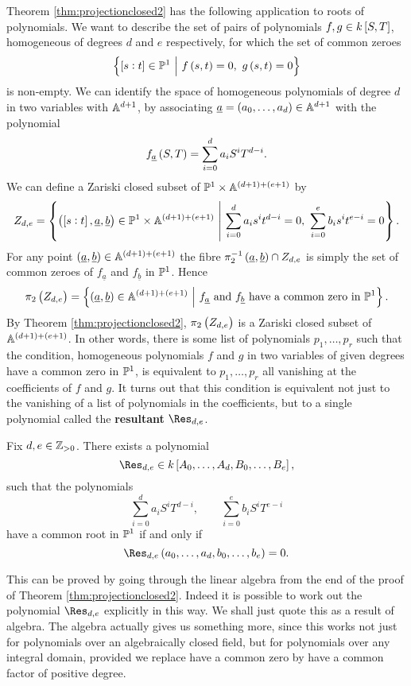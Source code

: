 Theorem \ref{thm:projectionclosed2} has the following application to roots of polynomials. We want to describe the set of pairs of polynomials $ f, g \in k\sbr{S, T} $, homogeneous of degrees $ d $ and $ e $ respectively, for which the set of common zeroes
$$ \cbr{\sbr{s : t} \in \PP^1 \st f\br{s, t} = 0, \ g\br{s, t} = 0} $$
is non-empty. We can identify the space of homogeneous polynomials of degree $ d $ in two variables with $ \AA^{d + 1} $, by associating $ \underline{a} = \br{a_0, \dots, a_d} \in \AA^{d + 1} $ with the polynomial
$$ f_{\underline{a}}\br{S, T} = \sum_{i = 0}^d a_iS^iT^{d - i}. $$
We can define a Zariski closed subset of $ \PP^1 \times \AA^{\br{d + 1} + \br{e + 1}} $ by
$$ Z_{d, e} = \cbr{\br{\sbr{s : t}, \underline{a}, \underline{b}} \in \PP^1 \times \AA^{\br{d + 1} + \br{e + 1}} \st \sum_{i = 0}^d a_is^it^{d - i} = 0, \ \sum_{i = 0}^e b_is^it^{e - i} = 0}. $$
For any point $ \br{\underline{a}, \underline{b}} \in \AA^{\br{d + 1} + \br{e + 1}} $ the fibre $ \pi_2^{-1}\br{\underline{a}, \underline{b}} \cap Z_{d, e} $ is simply the set of common zeroes of $ f_{\underline{a}} $ and $ f_{\underline{b}} $ in $ \PP^1 $. Hence
$$ \pi_2\br{Z_{d, e}} = \cbr{\br{\underline{a}, \underline{b}} \in \AA^{\br{d + 1} + \br{e + 1}} \st f_{\underline{a}} \ \text{and} \ f_{\underline{b}} \ \text{have a common zero in} \ \PP^1}. $$
By Theorem \ref{thm:projectionclosed2}, $ \pi_2\br{Z_{d, e}} $ is a Zariski closed subset of $ \AA^{\br{d + 1} + \br{e + 1}} $. In other words, there is some list of polynomials $ p_1, \dots, p_r $ such that the condition, homogeneous polynomials $ f $ and $ g $ in two variables of given degrees have a common zero in $ \PP^1 $, is equivalent to $ p_1, \dots, p_r $ all vanishing at the coefficients of $ f $ and $ g $. It turns out that this condition is equivalent not just to the vanishing of a list of polynomials in the coefficients, but to a single polynomial called the \textbf{resultant} $ \Res_{d, e} $.

\pagebreak

\begin{theorem}
\label{thm:fieldresultant}
Fix $ d, e \in \ZZ_{> 0} $. There exists a polynomial
$$ \Res_{d, e} \in k\sbr{A_0, \dots, A_d, B_0, \dots, B_e}, $$
such that the polynomials
$$ \sum_{i = 0}^d a_iS^iT^{d - i}, \qquad \sum_{i = 0}^e b_iS^iT^{e - i} $$
have a common root in $ \PP^1 $ if and only if
$$ \Res_{d, e}\br{a_0, \dots, a_d, b_0, \dots, b_e} = 0. $$
\end{theorem}

This can be proved by going through the linear algebra from the end of the proof of Theorem \ref{thm:projectionclosed2}. Indeed it is possible to work out the polynomial $ \Res_{d, e} $ explicitly in this way. We shall just quote this as a result of algebra. The algebra actually gives us something more, since this works not just for polynomials over an algebraically closed field, but for polynomials over any integral domain, provided we replace have a common zero by have a common factor of positive degree.

